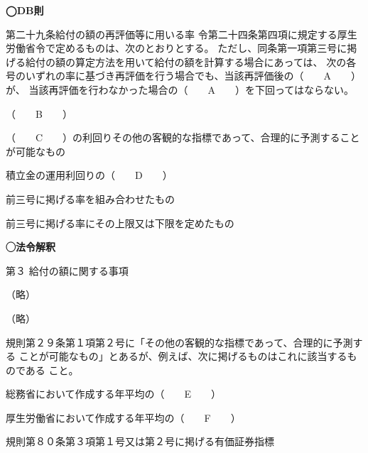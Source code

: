 \begin{fillblank}[数理人試験 H29 問題1 設問2]
  \noindent \textbf{◯DB則}
  \begin{lawstructure}
    \begin{lawarticle}{第二十九条}{給付の額の再評価等に用いる率}
      令第二十四条第四項に規定する厚生労働省令で定めるものは、次のとおりとする。
      ただし、同条第一項第三号に掲げる給付の額の算定方法を用いて給付の額を計算する場合にあっては、
      次の各号のいずれの率に基づき再評価を行う場合でも、当該再評価後の（　　A　　）が、
      当該再評価を行わなかった場合の（　　A　　）を下回ってはならない。

      （　　B　　）

      （　　C　　）の利回りその他の客観的な指標であって、合理的に予測することが可能なもの

      積立金の運用利回りの（　　D　　）

      前三号に掲げる率を組み合わせたもの

      前三号に掲げる率にその上限又は下限を定めたもの
      
    \end{lawarticle}

    \noindent \textbf{◯法令解釈}

    \begin{lawarticle}{}{}
      
      第３ 給付の額に関する事項

      （略）

      （略）

      規則第２９条第１項第２号に「その他の客観的な指標であって、合理的に予測する
ことが可能なもの」とあるが、例えば、次に掲げるものはこれに該当するものである
こと。

      総務省において作成する年平均の（　　E　　）

      厚生労働省において作成する年平均の（　　F　　）

      規則第８０条第３項第１号又は第２号に掲げる有価証券指標

    \end{lawarticle}

  \end{lawstructure}  
\end{fillblank}


